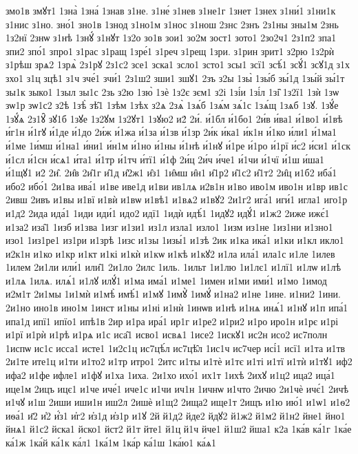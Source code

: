 {змо1в
змꙋт1
1зна̀
1зна́
1знав
з1не.
з1не́
з1нев
з1не1г
1знет
1знех
з1ни́1
з1ни1к
з1нис
з1но.
зно́1
зно1в
1знод
з1но1м
з1нос
з1нош
2знс
2знъ
2з1ны
зны1м
2знь
1з2нї
2знѡ
з1нѣ
1знꙋ́
з1нꙋт
1з2о
зо1в
зои1
зо2м
зост1
зото1
2зо2ч1
2з1п2
зпа1
зпи2
зпо́1
зпро1
з1рас
з1ращ
1зре́1
з1реч
з1рещ
1зри.
з1рин
зрит1
з2рю
1з2рѝ
з1рѣш
зрѧ2
1зрѧ̀
2з1рꙋ
2з1с2
зсе1
зска1
зсло1
зсто1
зсы1
зсї1
зсѣ́1
зсꙋ́1
зсꙋ1д
з1х
зхо1
з1ц
зцѣ1
з1ч
зче́1
зчи́1
2з1ш2
зши1
зшꙋ1
2зъ
з2ы
1зы̀
1зы́б
зы́1д
1зы́й
зы́1т
зы1к
зыко1
1зыл
зы1с
2зь
з2ю
1зю̀
1зѐ
1з2є
зєм1
з2і
1зі́и
1зі́л
1зі̑
1з2ї1
1зѝ
1зѡ
зѡ1р
зѡ1с2
з2ѣ
1зѣ̀
зѣ̑1
1зѣм
1зѣх
з2ѧ
2зѧ̀
1зѧ́б
1зѧ́м
зѧ́1с
1зѧ́щ
1зѧб
1зꙋ.
1зꙋ́е
1зꙋ́ѧ
2з1ꙋ̑
зꙋ1б
1зꙋе
1з2ꙋм
1з2ꙋт1
1зꙋю2
и2́
2и́.
и́1бл
и́1бо1
2и́в
и́ва1
и́1во1
и́1вѣ
и́г1н
и́1гꙋ
и́1де
и́1до
2и́ж
и́1жа
и́1за
и́1зв
и́1зр
2и́к
и́ка1
и́к1н
и́1ко
и́ли1
и́1ма1
и́1ме
1и́мш
и́1на1
и́ни1
и́н1м
и́1но
и́1ны
и́1нѣ
и́1нꙋ
и́1ре
и́1ро
и́1рї
и́с2
и́си1
и́1ск
и́1сл
и́1сн
и́сѧ1
и́та1
и́1тр
и́1тч
и́тї1
и́1ф
2и́ц
2и́ч
и́че1
и́1чи
и́1чї
и́1ш
и́ша1
и́1щꙋ1
и2̑
2и̑.
2и̑в
2и̑1г
и̑1д
и̑2ж1
и̑з1
1и̑мш
и̑н1
и̑1р2
и̑1с2
и̑1т2
2и̑ц
и1б2
иба́1
ибо2
ибо́1
2и1ва
ива́1
и1ве
иве1д
и1ви
ив1лѧ
и2в1н
и1во
иво1м
иво1н
и1вр
ив1с
2ивш
2ивъ
и1вы
и1вї
и1вѝ
и1вѡ
и1вѣ1
и1вѧ2
и1вꙋ2
2и1г2
ига́1
иги́1
игла1
иго1р
и1д2
2ида
ида́1
1иди
иди́1
идо2
идї1
1идѝ
идѣ́1
1идꙋ2
идꙋ́1
и1ж2
2иже
ижє́1
и1за2
иза̑1
1изб
и1зва
1изг
и1зи1
из1л
изла1
изло1
1изм
из1не
1из1ни
и1зно1
изо1
1из1ре1
из1ри
и1зрѣ
1изс
и1зы
1изы́1
и1зѣ
2ик
и1ка
ика́1
и1ки
и1кл
икло1
и2к1н
и1ко
и1кр
и1кт
и1кі
и1кѝ
и1кѡ
и1кѣ
и1кꙋ2
и1ла
ила́1
ила1с
и1ле
1илев
1илем
2и1ли
или́1
или̑1
2и1ло
2илс
1иль.
1ильт
1и1лю
1и1лє1
и1лї1
и1лѡ
и1лѣ
и1лѧ
1илѧ.
илѧ́1
и1лꙋ
илꙋ́1
и1ма
има́1
и1ме1
1имен
и1ми
ими́1
и1мо
1имод
и2м1т
2и1мы
1и1мѝ
и1мѣ̀
имѣ́1
и1мꙋ
1имꙋ̀
1имꙋ́
и1на2
и1не
1ине.
и1ни2
1ини.
2и1но
ино1в
ино1м
1инст
и1ны
и1ні
и1нѝ
1инѡв
и1нѣ
и1нѧ
инѧ́1
и1нꙋ
и1п
ипа́1
ипа1д
ипї1
ипїо1
ипѣ1в
2ир
и1ра
ира́1
ир1г
и1ре2
и1ри2
и1ро
иро1н
и1рє
и1рі
и1рї
и1рѝ
и1рѣ
и1рѧ
и1с
иса̑1
исво1
исвѧ1
1исе2
1искꙋ1
ис2н
исо2
ис7полн
1испѡ
ис1с
исса1
исте1
1и2с1ц
ис7цѣ́л
ис7цѣ̑л
1ис1ч
ис7чер
исі́1
исї1
и1та
и1тв
2и1те
ите1ц
и1ти
и1то2
и1тр
итро1
2итс
и1ты
и1тѐ
и1тє
и1ті
и1тї
и1тѝ
и1тꙋ1
иф2
ифа2
и1фе
ифле1
и1фꙋ
и1ха
1иха.
2и1хо
ихо́1
их1т
1ихѣ
2ихꙋ
и1ц2
ица2
ица́1
ице1м
2ицъ
ицє1
и1че
иче́1
иче1с
и1чи
ич1н
1ичнѡ
и1что
2ичю
2и1чѐ
ичє́1
2ичѣ
и1чꙋ
и1ш
2иши
иши1н
иш2л
2ишѐ
и1щ2
2ища2
ище1т
2ищъ
и1ю
ию́1
и1ѡ1
и1ѳ2
иѳа́1
и҃2
и҆2
и҆́з1
и҆г2
и҆з1д
и҆з1р
и1ꙋ
2й
й1д2
йде2
йдꙋ2
й1ж2
й1м2
й1н2
йне1
йно1
йнѧ1
й1с2
йска1
йско1
йст2
й1т
йте1
й1ц
й1ч
йче1
й1ш2
йша1
к2а
1ка́в
ка́1г
1ка́е
ка́1ж
1ка́й
ка́1к
ка́л1
1ка́1м
1ка́р
ка́1ш
1ка́ю1
ка́ѧ1
}
